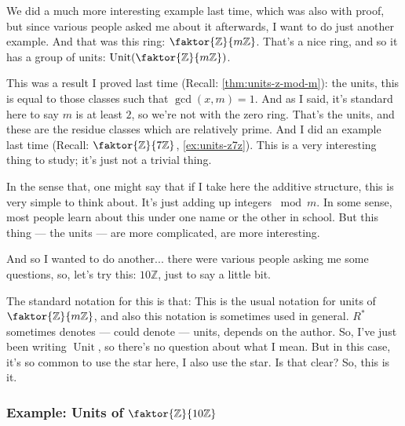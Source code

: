 \begin{speech}[00:05:14 - 00:07:18]
We did a much more interesting example last time, which was also with proof, but since various people asked me about it afterwards, I want to do just another example. And that was this ring: $\faktor{\mathbb{Z}}{m\mathbb{Z}}$.  That's a nice ring, and so it has a group of units: $\operatorname{Unit}(\faktor{\mathbb{Z}}{m\mathbb{Z}})$. 

This was a result I proved last time (Recall: \cref{thm:units-z-mod-m}): the units, this is equal to those classes such that $\operatorname{gcd}(x, m) = 1$.  And as I said, it's standard here to say $m$ is at least $2$, so we're not with the zero ring.  That's the units, and these are the residue classes which are relatively prime. And I did an example last time (Recall: $\faktor{\mathbb{Z}}{7\mathbb{Z}}$, \cref{ex:units-z7z}). This is a very interesting thing to study; it's just not a trivial thing.

In the sense that, one might say that if I take here the additive structure,  this is very simple to think about. It's just adding up integers $\bmod m$. In some sense, most people learn about this under one name or the other in school. But this thing --- the units --- are more complicated, are more interesting. 

And so I wanted to do another... there were various people asking me some questions, so, let's try this: $10\mathbb{Z}$, just to say a little bit.

The standard notation for this is that:  This is the usual notation for units of $\faktor{\mathbb{Z}}{m\mathbb{Z}}$, and also this notation is sometimes used in general. $R^*$ sometimes denotes --- could denote --- units, depends on the author. So, I've just been writing $\operatorname{Unit}$, so there's no question about what I mean. But in this case, it's so common to use the star here, I also use the star. Is that clear? So, this is it.
\end{speech}

\subsubsection{Example: Units of \texorpdfstring{$\faktor{\mathbb{Z}}{10\mathbb{Z}}$}{Z/10Z}}

